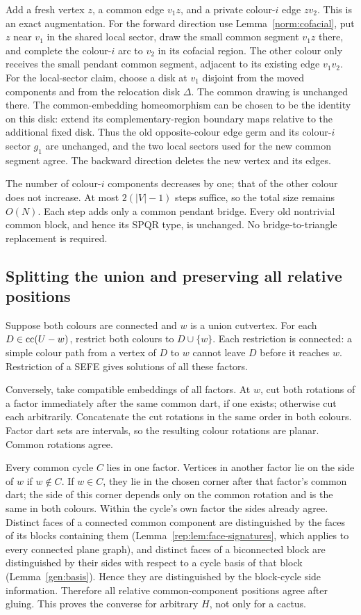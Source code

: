 Add a fresh vertex $z$, a common edge $v_1z$, and a private colour-$i$
edge $zv_2$. This is an exact augmentation. For the forward direction use
Lemma~\ref{norm:cofacial}, put $z$ near $v_1$ in the shared local sector,
draw the small common segment $v_1z$ there, and complete the colour-$i$
arc to $v_2$ in its cofacial region. The other colour only receives the
small pendant common segment, adjacent to its existing edge $v_1v_2$.
For the local-sector claim, choose a disk at $v_1$ disjoint from the moved
components and from the relocation disk $\Delta$. The common drawing is
unchanged there. The common-embedding homeomorphism can be chosen to be
the identity on this disk: extend its complementary-region boundary maps
relative to the additional fixed disk. Thus the old opposite-colour edge
germ and its colour-$i$ sector $g_1$ are unchanged, and the two local
sectors used for the new common segment agree.
The backward direction deletes the new vertex and its edges.

The number of colour-$i$ components decreases by one; that of the other
colour does not increase. At most $2(|V|-1)$ steps suffice, so the total
size remains $O(N)$. Each step adds only a common pendant bridge. Every
old nontrivial common block, and hence its SPQR type, is unchanged.
No bridge-to-triangle replacement is required.

\subsection{Splitting the union and preserving all relative positions}

Suppose both colours are connected and $w$ is a union cutvertex. For each
$D\in\operatorname{cc}(U-w)$, restrict both colours to $D\cup\{w\}$. Each restriction
is connected: a simple colour path from a vertex of $D$ to $w$ cannot
leave $D$ before it reaches $w$. Restriction of a SEFE gives solutions
of all these factors.

Conversely, take compatible embeddings of all factors. At $w$, cut both
rotations of a factor immediately after the same common dart, if one
exists; otherwise cut each arbitrarily. Concatenate the cut rotations
in the same order in both colours. Factor dart sets are intervals, so
the resulting colour rotations are planar. Common rotations agree.

Every common cycle $C$ lies in one factor. Vertices in another factor
lie on the side of $w$ if $w\notin C$. If $w\in C$, they lie in the
chosen corner after that factor's common dart; the side of this corner
depends only on the common rotation and is the same in both colours.
Within the cycle's own factor the sides already agree. Distinct faces
of a connected common component are distinguished by the faces of its
blocks containing them (Lemma~\ref{rep:lem:face-signatures}, which applies
to every connected plane graph), and distinct faces of a biconnected block
are distinguished by their sides with respect to a cycle basis of that
block (Lemma~\ref{gen:basis}). Hence they are distinguished by the
block-cycle side information. Therefore all relative common-component
positions agree after gluing. This proves the converse for arbitrary
$H$, not only for a cactus.

